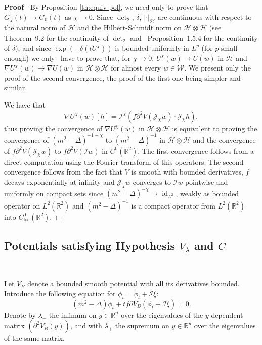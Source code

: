 \documentclass[a4paper,10pt]{article}
\newcommand{\tmop}[1]{\ensuremath{\operatorname{#1}}}
\newenvironment{proof}{\noindent\textbf{Proof\ }}{\hspace*{\fill}$\Box$\medskip}
\begin{document}
\begin{proof}
  By Proposition \ref{th:equiv-pol}, we need only to prove that $G_{\chi} (t)
  \rightarrow G_0 (t)$ as $\chi \rightarrow 0$. Since $\det_2$, $\delta$, $|
  \cdot |_{\mathcal{H}}$ are continuous with respect to the natural norm of
  $\mathcal{H}$ and the Hilbert-Schmidt norm on $\mathcal{H} \otimes
  \mathcal{H}$ (see~{\cite{Simon2005}} Theorem~9.2 for the continuity of
  $\det_2$ and~{\cite{Nualart2006}} Proposition~1.5.4 for the continuity of
  $\delta$), and since $\exp (- \delta (t U^{\chi}))$ is bounded uniformly in
  $L^p$ (for $p$ small enough) we only \ have to prove that, for $\chi
  \rightarrow 0$, $U^{\chi} (w) \rightarrow U (w)$ in $\mathcal{H}$ and
  $\nabla U^{\chi} (w) \rightarrow \nabla U (w)$ in $\mathcal{H} \otimes
  \mathcal{H}$ for almost every $w \in \mathcal{W}$. We present only the proof
  of the second convergence, the proof of the first one being simpler and
  similar.
  
  We have that
  \[ \nabla U^{\chi} (w) [h] =\mathcal{I}^{\chi} (f \partial^2 V (\mathcal{J}_{\chi} w) \cdot
     \mathcal{J}_{\chi} h), \]
  thus proving the convergence of $\nabla U^{\chi} (w)$ in $\mathcal{H}
  \otimes \mathcal{H}$ is equivalent to proving the convergence of $(m^2 -
  \Delta)^{- 1 - \chi}$ to $(m^2 - \Delta)^{- 1}$ in $\mathcal{H} \otimes
  \mathcal{H}$ and the convergence of $f \partial^2 V (\mathcal{J}_{\chi} w)$
  to $f \partial^2 V (\mathcal{I} w)$ in $C^0 (\mathbb{R}^2)$. The first
  convergence follows from a direct computation using the Fourier transform of
  this operators. The second convergence follows from the fact that $V$ is
  smooth with bounded derivatives, $f$ decays exponentially at infinity and
  $\mathcal{J}_{\chi} w$ converges to $\mathcal{I} w$ pointwise and uniformly
  on compact sets since $(m^2 - \Delta)^{- \chi} \rightarrow \tmop{id}_{L^2}$,
  weakly as bounded operator on $L^2 (\mathbb{R}^2)$ and $(m^2 - \Delta)^{-
  1}$ is a compact operator from $L^2 (\mathbb{R}^2)$ into $C^0_{\tmop{loc}}
  (\mathbb{R}^2)$.
\end{proof}

\subsection{Potentials satisfying Hypothesis $V_{\lambda}$ and $C$}

\

Let $V_B$ denote a bounded smooth potential with all its derivatives bounded.
Introduce the following equation for $\phi_t = \bar{\phi}_t +\mathcal{I} \xi$:
\begin{equation}
  (m^2 - \Delta) \bar{\phi}_t + t f \partial V_B (\bar{\phi}_t +\mathcal{I}
  \xi) = 0 \label{equationanalytic1} .
\end{equation}
Denote by $\lambda_-$ the infimum on $y \in \mathbb{R}^n$ over the eigenvalues
of the $y$ dependent matrix $(\partial^2 V_B (y))$, and with $\lambda_+$ the
supremum on $y \in \mathbb{R}^n$ over the eigenvalues of the same matrix.
\end{document}
